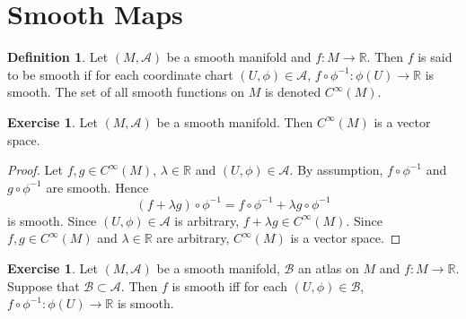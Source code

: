 \documentclass{book}
\theoremstyle{definition}
\newtheorem{defn}[definition]{Definition}
\newtheorem{ex}[definition]{Exercise}
\newcommand{\lam}{\lambda}
\newcommand{\R}{\mathbb{R}}
\newcommand{\MA}{\mathcal{A}}
\newcommand{\MB}{\mathcal{B}}
\newcommand{\ld}[1]{\label{defn:#1}}
\DeclareMathOperator*{\0}{\mbf{0}}
\DeclareMathOperator*{\1}{\mbf{1}}
\begin{document}
	
	
	
	
	
	
	
	
	
	
	
	
	

	
	
	
	
	
	
	
	
	
	
	
	
	
	
	
	
	\newpage 
	\section{Smooth Maps}	
	
	\begin{defn} \ld{42001}
		Let $(M, \MA)$ be a smooth manifold and $f: M \rightarrow \R$. Then $f$ is said to be smooth if for each coordinate chart $(U, \phi) \in \MA$, $f \circ \phi^{-1}: \phi(U) \rightarrow \R$ is smooth. The set of all smooth functions on $M$ is denoted $C^{\infty}(M)$. 
	\end{defn}

	\begin{ex} \ld{42002}
		Let $(M, \MA)$ be a smooth manifold. Then $C^{\infty}(M)$ is a vector space.
	\end{ex}

	\begin{proof}
		Let $f,g \in C^{\infty}(M)$, $\lam \in \R$ and $(U, \phi) \in \MA$. By assumption, $f \circ \phi^{-1}$ and $g \circ \phi^{-1}$ are smooth. Hence 
		$$(f + \lam g) \circ \phi^{-1} = f \circ \phi^{-1} + \lam g \circ \phi^{-1} $$
		is smooth. Since $(U, \phi) \in \MA$ is arbitrary, $f + \lam g \in C^{\infty}(M)$. Since $f,g \in C^{\infty}(M)$ and $\lam \in \R$ are arbitrary, $C^{\infty}(M)$ is a vector space.
	\end{proof}

	\begin{ex}
		Let $(M, \MA)$ be a smooth manifold, $\MB$ an atlas on $M$ and $f:M \rightarrow \R$. Suppose that $\MB \subset \MA$. Then $f$ is smooth iff for each $(U, \phi) \in \MB$, $f \circ \phi^{-1}: \phi(U) \rightarrow \R$ is smooth.
	\end{ex}
\end{document}
